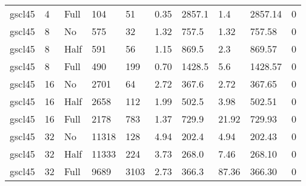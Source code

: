 \documentclass[11pt,landscape]{article}
\begin{document}
\begin{tabular}{llllllllll}
 gscl45 & 4         & Full       & 104        & 51    & 0.35          & 2857.1    & 1.4       & 2857.14     & 0     \\
 gscl45 & 8         & No         & 575        & 32    & 1.32          & 757.5     & 1.32      & 757.58      & 0     \\
 gscl45 & 8         & Half       & 591        & 56    & 1.15          & 869.5     & 2.3       & 869.57      & 0     \\
 gscl45 & 8         & Full       & 490        & 199   & 0.70          & 1428.5    & 5.6       & 1428.57     & 0     \\
 gscl45 & 16        & No         & 2701       & 64    & 2.72          & 367.6     & 2.72      & 367.65      & 0     \\
 gscl45 & 16        & Half       & 2658       & 112   & 1.99          & 502.5     & 3.98      & 502.51      & 0     \\
 gscl45 & 16        & Full       & 2178       & 783   & 1.37          & 729.9     & 21.92     & 729.93      & 0     \\
 gscl45 & 32        & No         & 11318      & 128   & 4.94          & 202.4     & 4.94      & 202.43      & 0     \\
 gscl45 & 32        & Half       & 11333      & 224   & 3.73          & 268.0     & 7.46      & 268.10      & 0     \\
 gscl45 & 32        & Full       & 9689       & 3103  & 2.73          & 366.3     & 87.36     & 366.30      & 0     \\
\hline
\end{tabular}
\end{document}
